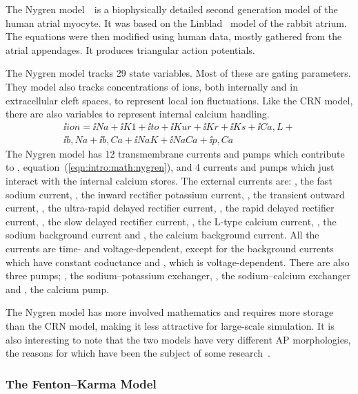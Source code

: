 The Nygren model~\cite{Nygren1998}\ is a biophysically detailed second
generation model of the human atrial myocyte.
It was based on the Linblad~\cite{Lindblad1996} model of the rabbit atrium.
The equations were then modified using human data, mostly gathered from the
atrial appendages.
It produces triangular action potentials.

The Nygren model tracks 29 state variables.
Most of these are gating parameters.
They model also tracks concentrations of ions, both internally and in
extracellular cleft spaces, to represent local ion fluctuations.
Like the CRN model, there are also variables to represent internal calcium
handling.
\begin{align}
\label{eqn:intro:math:nygren}
\ii{ion} = \ii{Na} + \ii{K1} + \ii{to} + \ii{Kur} + \ii{Kr} + \ii{Ks} + 
\ii{Ca,L} + \nonumber \\
\ii{b,Na} + \ii{b,Ca} + \ii{NaK} + \ii{NaCa} + \ii{p,Ca}
\end{align}
The Nygren model has 12 transmembrane currents and pumps which contribute to ,
equation~(\ref{eqn:intro:math:nygren}), and 4 currents and
pumps which just interact with the internal calcium stores.
The external currents are: , the fast sodium current, , the inward
rectifier potassium current, , the transient outward current, , the
ultra-rapid delayed rectifier current, , the rapid delayed rectifier
current, , the slow delayed rectifier current, , the L-type
calcium current, , the sodium background current and , the
calcium background current.
All the currents are time- and voltage-dependent, except for the background
currents which have constant coductance and , which is voltage-dependent.
There are also three pumps; , the sodium--potassium exchanger,
, the sodium--calcium exchanger and , the calcium pump.

The Nygren model has more involved mathematics and requires more storage than
the CRN model, making it less attractive for large-scale simulation.
It is also interesting to note that the two models have very different
AP morphologies, the reasons for which have been the subject of some
research~\cite{Nygren2001,Syed2005,Cherry2008}.

\subsubsection{The Fenton--Karma Model}
\label{sec:intro:math:fk}


